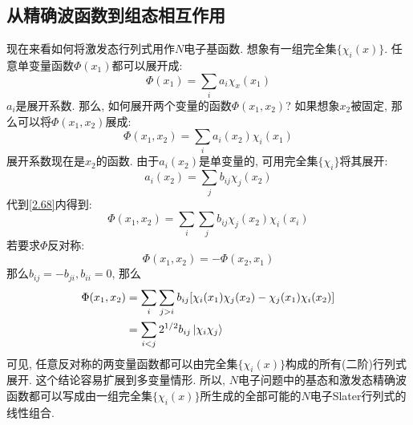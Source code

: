 \subsection{从精确波函数到组态相互作用}
 \label{sec2.2.7}
现在来看如何将激发态行列式用作$N$电子基函数. 
想象有一组完全集$\{\chi_i(x)\}$. 
任意单变量函数$\Phi(x_1)$都可以展开成:
\begin{equation}
	\Phi(x_1)=\sum_ia_i\chi_x(x_1)
\end{equation}
$a_i$是展开系数. 那么, 如何展开两个变量的函数$\Phi(x_1,x_2)$? 如果想象$x_2$被固定, 那么可以将$\Phi(x_1,x_2)$展成:
\begin{equation}
\label{2.68}
\Phi(x_1,x_2)=\sum_ia_i(x_2)\chi_i(x_1)
\end{equation}
展开系数现在是$x_2$的函数. 
由于$a_i(x_2)$是单变量的, 
可用完全集$\{\chi_i \}$将其展开:
\begin{equation}
a_i(x_2)=\sum_jb_{ij}\chi_j(x_2)
\end{equation}
代到\ref{2.68}内得到:
\begin{equation}
\Phi(x_1,x_2)=\sum_i\sum_jb_{ij}\chi_j(x_2)\chi_i(x_i)
\end{equation}
若要求$\Phi$反对称:
\begin{equation}
\Phi(x_1,x_2)=-\Phi(x_2,x_1)
\end{equation}
那么$b_{ij}=-b_{ji},b_{ii}=0$, 
那么
\begin{equation}
\begin{split}
\Phi(x_1,x_2)&=\sum_i\sum_{j>i}b_{ij}[\chi_i(x_1)\chi_j(x_2)-\chi_j(x_1)\chi_i(x_2)]\\
&=\sum_{i<j}2^{1/2}b_{ij}\Ket{\chi_i\chi_j}
\end{split}
\end{equation}
可见, 
任意反对称的两变量函数都可以由完全集$\{\chi_i(x)\}$构成的所有(二阶)行列式展开. 
这个结论容易扩展到多变量情形. 
所以, 
$N$电子问题中的基态和激发态精确波函数都可以写成由一组完全集$\{\chi_i(x) \}$所生成的全部可能的$N$电子Slater行列式的线性组合.


